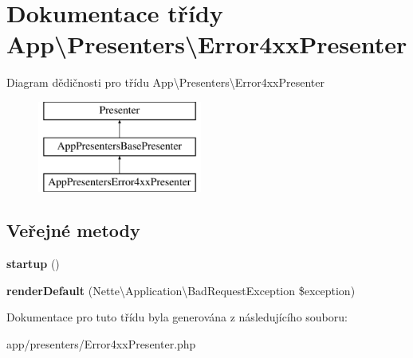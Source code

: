 \hypertarget{classApp_1_1Presenters_1_1Error4xxPresenter}{\section{Dokumentace třídy App\textbackslash{}Presenters\textbackslash{}Error4xx\-Presenter}
\label{classApp_1_1Presenters_1_1Error4xxPresenter}
}
Diagram dědičnosti pro třídu App\textbackslash{}Presenters\textbackslash{}Error4xx\-Presenter\begin{figure}[H]
\begin{center}
\leavevmode
\includegraphics[height=3.000000cm]{classApp_1_1Presenters_1_1Error4xxPresenter}
\end{center}
\end{figure}
\subsection*{Veřejné metody}
\begin{DoxyCompactItemize}
\item 
\hypertarget{classApp_1_1Presenters_1_1Error4xxPresenter_a74554da47cce26e25d783141c95da87b}{{\bfseries startup} ()}\label{classApp_1_1Presenters_1_1Error4xxPresenter_a74554da47cce26e25d783141c95da87b}

\item 
\hypertarget{classApp_1_1Presenters_1_1Error4xxPresenter_a7b1526f98943508230687ae594873c1d}{{\bfseries render\-Default} (Nette\textbackslash{}\-Application\textbackslash{}\-Bad\-Request\-Exception \$exception)}\label{classApp_1_1Presenters_1_1Error4xxPresenter_a7b1526f98943508230687ae594873c1d}

\end{DoxyCompactItemize}


Dokumentace pro tuto třídu byla generována z následujícího souboru\-:\begin{DoxyCompactItemize}
\item 
app/presenters/Error4xx\-Presenter.\-php\end{DoxyCompactItemize}
